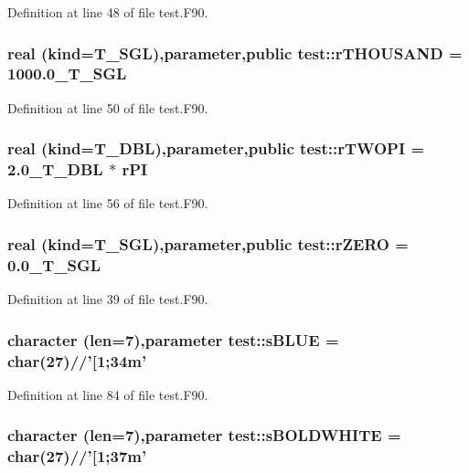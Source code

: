 Definition at line 48 of file test.F90.

\hypertarget{namespacetest_a09ee29fcb038648024d5f3021e2f8e05}{
\subsubsection[{rTHOUSAND}]{\setlength{\rightskip}{0pt plus 5cm}real (kind={\bf T\_\-SGL}),parameter,public {\bf test::rTHOUSAND} = 1000.0\_\-T\_\-SGL}}
\label{namespacetest_a09ee29fcb038648024d5f3021e2f8e05}


Definition at line 50 of file test.F90.

\hypertarget{namespacetest_a28a64e68af4df21c5a1c16a3dad0a400}{
\subsubsection[{rTWOPI}]{\setlength{\rightskip}{0pt plus 5cm}real (kind={\bf T\_\-DBL}),parameter,public {\bf test::rTWOPI} = 2.0\_\-T\_\-DBL $\ast$ rPI}}
\label{namespacetest_a28a64e68af4df21c5a1c16a3dad0a400}


Definition at line 56 of file test.F90.

\hypertarget{namespacetest_a9bd8aefd97474e9bd8eb52d36c5d1ea2}{
\subsubsection[{rZERO}]{\setlength{\rightskip}{0pt plus 5cm}real (kind={\bf T\_\-SGL}),parameter,public {\bf test::rZERO} = 0.0\_\-T\_\-SGL}}
\label{namespacetest_a9bd8aefd97474e9bd8eb52d36c5d1ea2}


Definition at line 39 of file test.F90.

\hypertarget{namespacetest_a67805434e80e529c4296afa41874d705}{
\subsubsection[{sBLUE}]{\setlength{\rightskip}{0pt plus 5cm}character (len=7),parameter {\bf test::sBLUE} = char(27)//'\mbox{[}1;34m'}}
\label{namespacetest_a67805434e80e529c4296afa41874d705}


Definition at line 84 of file test.F90.

\hypertarget{namespacetest_a30a237c02c2640389d102030736a9a64}{
\subsubsection[{sBOLDWHITE}]{\setlength{\rightskip}{0pt plus 5cm}character (len=7),parameter {\bf test::sBOLDWHITE} = char(27)//'\mbox{[}1;37m'}}
\label{namespacetest_a30a237c02c2640389d102030736a9a64}



